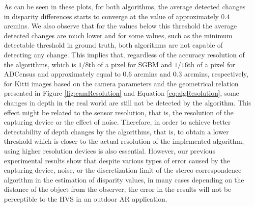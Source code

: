 As can be seen in these plots, for both algorithms, the average detected changes in disparity differences starts to converge at the value of approximately $0.4$ arcmins.
We also observe that for the values below this threshold the average detected changes are much lower and for some values, such as the minimum detectable threshold in ground truth,
both algorithms are not capable of detecting any change. 
This implies that, regardless of the accuracy resolution of the algorithms, which is $1/8$th of a pixel for SGBM and $1/16$th of a pixel for ADCensus and approximately equal to
$0.6$ arcmins and $0.3$ arcmins, respectively, for Kitti images based on the camera parameters and the geometrical relation presented in Figure \ref{fig:camResolution} and 
Equation \ref{eq:algResolution}, some changes in 
depth in the real world are still not be detected by the algorithm. This effect might be related to the sensor resolution, that is, the resolution of the capturing device or the effect
of noise. Therefore, in order to achieve better detectability of depth changes by the algorithms, that is, to obtain a lower threshold
which is closer to the actual resolution of the implemented algorithm, using higher resolution devices is also essential.
However, our previous experimental results show that despite various types of error caused by the capturing device, noise, or the discretization limit of the stereo correspondence 
algorithm in the estimation of disparity values, in many cases depending on the distance of the object from the observer,  
the error in the results will not be perceptible to the HVS in an outdoor AR
application.

